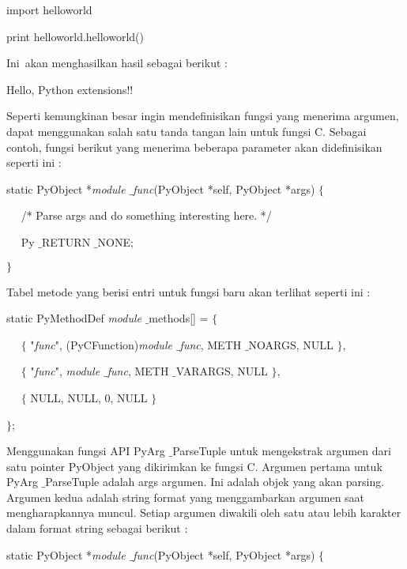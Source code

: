 \documentclass[a4paper,12pt]{report}
\begin{document}
\noindent 
import helloworld \par
\vspace{12pt}
\noindent 
print helloworld.helloworld() \par
\vspace{14pt}
\noindent 
Ini~akan menghasilkan hasil sebagai berikut  : \par
\noindent 
Hello, Python extensions!! \par
\vspace{12pt}
Seperti kemungkinan besar ingin mendefinisikan fungsi yang menerima argumen, dapat menggunakan salah satu tanda tangan lain untuk fungsi C. Sebagai contoh, fungsi berikut yang menerima beberapa parameter akan didefinisikan seperti ini : \par
\noindent 
static PyObject *\textit{module $  \_  $func}(PyObject *self, PyObject *args)  $  \{  $ \par
\noindent 
~~ /* Parse args and do something interesting here. */ \par
\noindent 
~~ Py $  \_  $RETURN $  \_  $NONE; \par
\noindent 
 $  \}  $ \par
\vspace{12pt}
Tabel metode yang berisi entri untuk fungsi baru akan terlihat seperti ini : \par
\noindent 
static PyMethodDef \textit{module} $  \_  $methods[] =  $  \{  $ \par
\noindent 
~~  $  \{  $ "\textit{func}", (PyCFunction)\textit{module $  \_  $func}, METH $  \_  $NOARGS, NULL  $  \}  $, \par
\noindent 
~~  $  \{  $ "\textit{func}", \textit{module $  \_  $func}, METH $  \_  $VARARGS, NULL  $  \}  $, \par
\noindent 
~~  $  \{  $ NULL, NULL, 0, NULL  $  \}  $ \par
\noindent 
 $  \}  $; \par
\vspace{12pt}
Menggunakan fungsi API PyArg $  \_  $ParseTuple untuk mengekstrak argumen dari satu pointer PyObject yang dikirimkan ke fungsi C. Argumen pertama untuk PyArg $  \_  $ParseTuple adalah args argumen. Ini adalah objek yang akan parsing. Argumen kedua adalah string format yang menggambarkan argumen saat mengharapkannya muncul. Setiap argumen diwakili oleh satu atau lebih karakter dalam format string sebagai berikut : \par
\noindent 
static PyObject *\textit{module $  \_  $func}(PyObject *self, PyObject *args)  $  \{  $ \par
\end{document}
